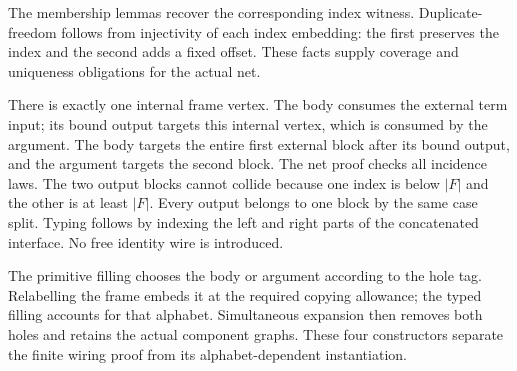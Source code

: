 



The membership lemmas recover the corresponding index witness.
Duplicate-freedom follows from injectivity of each index embedding: the first
preserves the index and the second adds a fixed offset. These facts supply
coverage and uniqueness obligations for the actual net.





There is exactly one internal frame vertex. The body consumes the
external term input; its bound output targets this internal vertex, which
is consumed by the argument. The body targets the entire first external
block after its bound output, and the argument targets the second block.
The net proof checks all incidence laws. The two output blocks cannot collide
because one index is below $|F|$ and the other is at least $|F|$. Every output
belongs to one block by the same case split. Typing follows by indexing the
left and right parts of the concatenated interface. No free identity wire
is introduced.




The primitive filling chooses the body or argument according to the
hole tag. Relabelling the frame embeds it at the required copying allowance;
the typed filling accounts for that alphabet. Simultaneous expansion then
removes both holes and retains the actual component graphs. These four
constructors separate the finite wiring proof from its alphabet-dependent
instantiation.


